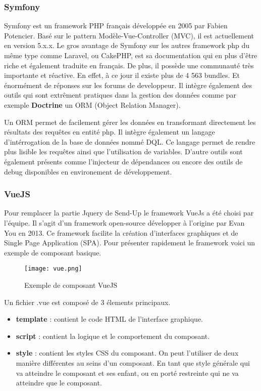 \subsubsection{Symfony}
Symfony\cite{symfony} est un framework PHP français développée en 2005 par Fabien Potencier. Basé sur le pattern Modèle-Vue-Controller (MVC), il est actuellement en version 5.x.x.  Le gros avantage de Symfony sur les autres framework php du même type comme Laravel, ou CakePHP, est sa documentation qui en plus d'être riche et également traduite en français. De plus, il possède une communauté très importante et réactive. En effet, à ce jour il existe plus de 4 563 bundles. Et énormément de réponses sur les forums de developpeur. Il intègre également des outils qui sont extrêment pratiques dans la gestion des données comme par exemple \textbf{Doctrine}\cite{doctrine} un ORM (Object Relation Manager).

Un ORM permet de facilement gérer les données en transformant directement les résultats des requêtes en entité php. Il intègre également un langage d'intérrogation de la base de données nommé DQL. Ce langage permet de rendre plus lisible les requêtes ainsi que l'utilisation de variables. D'autre outils sont également présents comme l'injecteur de dépendances ou encore des outils de debug disponibles en environement de développement.  


\subsubsection{VueJS}
Pour remplacer la partie Jquery de Send-Up le framework VueJs\cite{vue} a été choisi par l'équipe. Il s'agit d'un framework open-source développer à l'origine par Evan You en 2013. Ce framework facilite la création d'interfaces graphiques et de Single Page Application (SPA). Pour présenter rapidement le framework voici un exemple de composant basique. 

\begin{figure}[htbp]
    \center
    \texttt{[image: vue.png]}
    \caption{Exemple de composant VueJS}
\end{figure}

Un fichier .vue est composé de 3 élements principaux.
\begin{itemize}
    \item \textbf{template} : contient le code HTML de l'interface graphique.
    \item \textbf{script} : contient la logique et le comportement du composant. 
    \item \textbf{style} : contient les styles CSS du composant. On peut l'utiliser de deux manière différentes au seins d'un composant. En tant que style générale qui va atteindre le composant et ses enfant, ou en porté restreinte qui ne va atteindre que le composant. 
\end{itemize}

